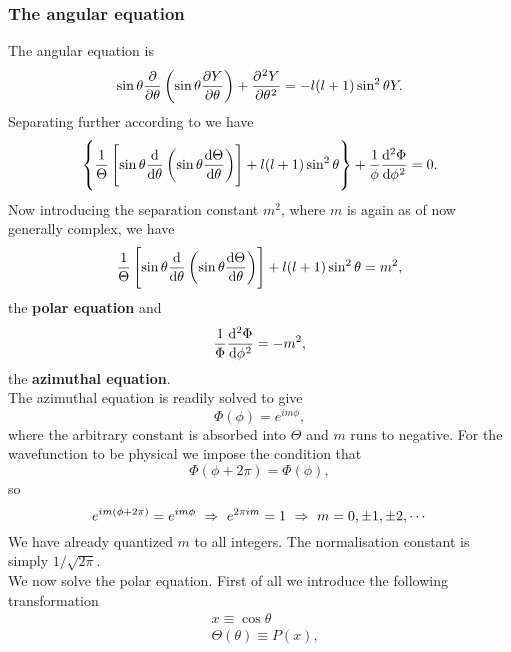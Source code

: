 \subsubsection{The angular equation}
The angular equation is
\begin{equation}
\sin\theta\diffp{}{\theta}\lf(\sin\theta\diffp Y\theta \rt)+\diffp[2]Y\theta=-l(l+1)\sin^2\theta Y.
\end{equation}
Separating further according to  we have
\begin{equation}
\label{angulareq}
\lf\{\frac{1}{\Theta}\lf[\sin\theta\diff{}{\theta}\lf(\sin\theta\diff{\Theta}{\theta} \rt) \rt]+l(l+1)\sin^2\theta \rt\}+\frac{1}{\phi}\diff[2]{\Phi}{\phi}=0.
\end{equation}
Now introducing the separation constant $m^2$, where $m$ is again as of now generally 
complex, we have
\begin{equation}
\label{polareq}
\frac{1}{\Theta}\lf[\sin\theta\diff{}{\theta}\lf(\sin\theta\diff{\Theta}{\theta} \rt) \rt]+l(l+1)\sin^2\theta=m^2, 
\end{equation}
the \textbf{polar equation} and
\begin{equation}
\label{azieq}
\frac{1}{\Phi}\diff[2]{\Phi}{\phi}=-m^2, 
\end{equation}
the \textbf{azimuthal equation}. \\
The azimuthal equation is readily solved to give
\begin{equation}
\Phi(\phi)=e^{im\phi}, 
\end{equation}
where the arbitrary constant is absorbed into $\Theta$ and $m$ runs to negative. 
For the wavefunction to be physical we impose the condition that
\begin{equation}
\Phi(\phi+2\pi)=\Phi(\phi), 
\end{equation}
so
\begin{equation}
e^{im(\phi+2\pi)}=e^{im\phi}\ \imp\ e^{2\pi im}=1\ \imp\ m=0,\pm1,\pm2,\cdots
\end{equation}
We have already quantized $m$ to all integers. The normalisation constant is simply $1/\sqrt{2\pi}$. \\
We now solve the polar equation. First of all we introduce the following transformation  
\begin{subequations}
\begin{align}
&x\equiv\cos\theta\\
&\Theta(\theta)\equiv P(x), 
\end{align}
\end{subequations}
